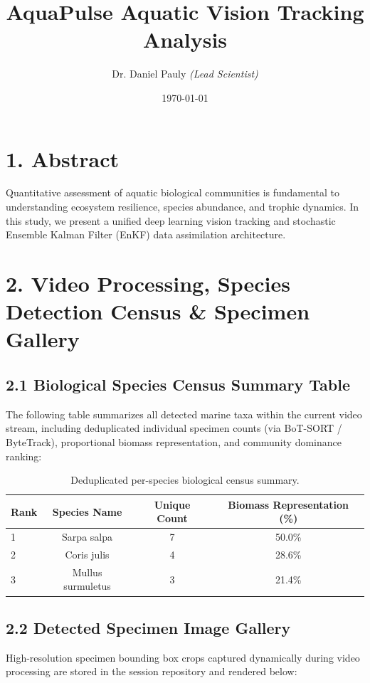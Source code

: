 \documentclass[11pt,a4paper]{article}
\title{\textbf{AquaPulse Aquatic Vision Tracking Analysis}}
\author{Dr. Daniel Pauly \textit{(Lead Scientist)}}
\date{\today}
\begin{document}
\maketitle

\section*{1. Abstract}
Quantitative assessment of aquatic biological communities is fundamental to understanding ecosystem resilience, species abundance, and trophic dynamics. In this study, we present a unified deep learning vision tracking and stochastic Ensemble Kalman Filter (EnKF) data assimilation architecture.

\section*{2. Video Processing, Species Detection Census \& Specimen Gallery}
\subsection*{2.1 Biological Species Census Summary Table}
The following table summarizes all detected marine taxa within the current video stream, including deduplicated individual specimen counts (via BoT-SORT / ByteTrack), proportional biomass representation, and community dominance ranking:

\begin{table}[h!]
\centering
\begin{tabular}{lccc}
\toprule
\textbf{Rank} & \textbf{Species Name} & \textbf{Unique Count} & \textbf{Biomass Representation (\%)} \\
\midrule
1 & Sarpa salpa & 7 & 50.0\% \\
2 & Coris julis & 4 & 28.6\% \\
3 & Mullus surmuletus & 3 & 21.4\% \\

\bottomrule
\end{tabular}
\caption{Deduplicated per-species biological census summary.}
\end{table}

\subsection*{2.2 Detected Specimen Image Gallery}
High-resolution specimen bounding box crops captured dynamically during video processing are stored in the session repository and rendered below:
\end{document}
